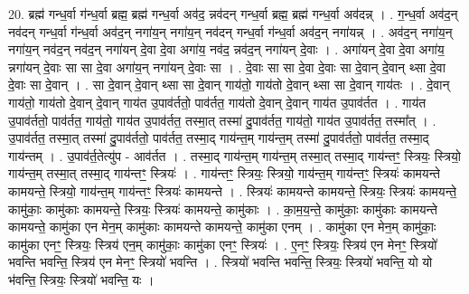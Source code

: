 \documentclass[17pt]{extarticle}
\begin{document}
20. ब्रह्म॑ गन्ध॒र्वा ग॑न्ध॒र्वा ब्रह्म॒ ब्रह्म॑ गन्ध॒र्वा अव॑द॒ न्नव॑दन् गन्ध॒र्वा ब्रह्म॒ ब्रह्म॑ गन्ध॒र्वा अव॑दन्न् । . ग॒न्ध॒र्वा अव॑द॒न् नव॑दन् गन्ध॒र्वा ग॑न्ध॒र्वा अव॑द॒न् नगा॑य॒न् नगा॑य॒न् नव॑दन् गन्ध॒र्वा ग॑न्ध॒र्वा अव॑द॒न् नगा॑यन्न् । . अव॑द॒न् नगा॑य॒न् नगा॑य॒न् नव॑द॒न् नव॑द॒न् नगा॑यन् दे॒वा दे॒वा अगा॑य॒ नव॑द॒ न्नव॑द॒न् नगा॑यन् दे॒वाः । . अगा॑यन् दे॒वा दे॒वा अगा॑य॒ न्नगा॑यन् दे॒वाः सा सा दे॒वा अगा॑य॒न् नगा॑यन् दे॒वाः सा । . दे॒वाः सा सा दे॒वा दे॒वाः सा दे॒वान् दे॒वान् थ्सा दे॒वा दे॒वाः सा दे॒वान् । . सा दे॒वान् दे॒वान् थ्सा सा दे॒वान् गाय॑तो॒ गाय॑तो दे॒वान् थ्सा सा दे॒वान् गाय॑तः । . दे॒वान् गाय॑तो॒ गाय॑तो दे॒वान् दे॒वान् गाय॑त उ॒पाव॑र्ततो॒ पाव॑र्तत॒ गाय॑तो दे॒वान् दे॒वान् गाय॑त उ॒पाव॑र्तत । . गाय॑त उ॒पाव॑र्ततो॒ पाव॑र्तत॒ गाय॑तो॒ गाय॑त उ॒पाव॑र्तत॒ तस्मा॒त् तस्मा॑ दु॒पाव॑र्तत॒ गाय॑तो॒ गाय॑त उ॒पाव॑र्तत॒ तस्मा᳚त् । . उ॒पाव॑र्तत॒ तस्मा॒त् तस्मा॑ दु॒पाव॑र्ततो॒ पाव॑र्तत॒ तस्मा॒द् गाय॑न्त॒म् गाय॑न्त॒म् तस्मा॑ दु॒पाव॑र्ततो॒ पाव॑र्तत॒ तस्मा॒द् गाय॑न्तम् । . उ॒पाव॑र्त॒तेत्यु॑प - आव॑र्तत । . तस्मा॒द् गाय॑न्त॒म् गाय॑न्त॒म् तस्मा॒त् तस्मा॒द् गाय॑न्तꣳ॒॒ स्त्रियः॒ स्त्रियो॒ गाय॑न्त॒म् तस्मा॒त् तस्मा॒द् गाय॑न्तꣳ॒॒ स्त्रियः॑ । . गाय॑न्तꣳ॒॒ स्त्रियः॒ स्त्रियो॒ गाय॑न्त॒म् गाय॑न्तꣳ॒॒ स्त्रियः॑ कामयन्ते कामयन्ते॒ स्त्रियो॒ गाय॑न्त॒म् गाय॑न्तꣳ॒॒ स्त्रियः॑ कामयन्ते । . स्त्रियः॑ कामयन्ते कामयन्ते॒ स्त्रियः॒ स्त्रियः॑ कामयन्ते॒ कामु॑काः॒ कामु॑काः कामयन्ते॒ स्त्रियः॒ स्त्रियः॑ कामयन्ते॒ कामु॑काः । . का॒म॒य॒न्ते॒ कामु॑काः॒ कामु॑काः कामयन्ते कामयन्ते॒ कामु॑का एन मेन॒म् कामु॑काः कामयन्ते कामयन्ते॒ कामु॑का एनम् । . कामु॑का एन मेन॒म् कामु॑काः॒ कामु॑का एनꣳ॒॒ स्त्रियः॒ स्त्रिय॑ एन॒म् कामु॑काः॒ कामु॑का एनꣳ॒॒ स्त्रियः॑ । . ए॒नꣳ॒॒ स्त्रियः॒ स्त्रिय॑ एन मेनꣳ॒॒ स्त्रियो॑ भवन्ति भवन्ति॒ स्त्रिय॑ एन मेनꣳ॒॒ स्त्रियो॑ भवन्ति । . स्त्रियो॑ भवन्ति भवन्ति॒ स्त्रियः॒ स्त्रियो॑ भवन्ति॒ यो यो भ॑वन्ति॒ स्त्रियः॒ स्त्रियो॑ भवन्ति॒ यः । \newline
\end{document}
